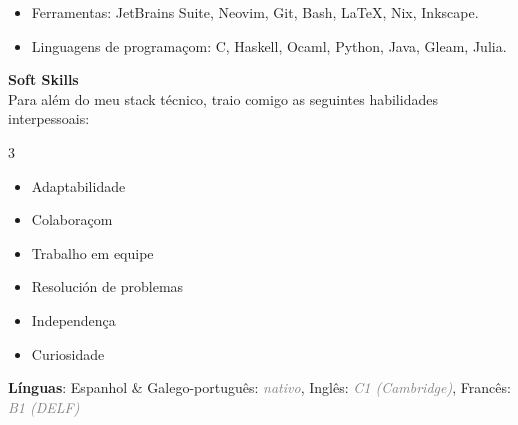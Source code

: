 \documentclass [a4paper] {extarticle} %
\newcommand{\rightcolumwidth}{0.84}
\begin{document}
\begin {flushright}
\begin {minipage} [t] {\rightcolumwidth\textwidth}

  \vspace {-8pt}
  \begin {itemize} [noitemsep]
    \item Ferramentas: JetBrains Suite, Neovim, Git, Bash, LaTeX, Nix, Inkscape.
    \item Linguagens de programaçom: C, Haskell, Ocaml, Python, Java, Gleam, Julia.
  \end {itemize}

  \textbf {Soft Skills} \\ [4pt]
  Para além do meu stack técnico, traio comigo as seguintes habilidades interpessoais:
  \vspace {-8pt}
  \begin{multicols}{3}
    \begin {itemize} [noitemsep]
      \item Adaptabilidade
      \item Colaboraçom
      \item Trabalho em equipe
      \item Resolución de problemas
      \item Independença
      \item Curiosidade
    \end {itemize}
  \end{multicols}

  \textbf{Línguas}: Espanhol \& Galego-português: \textcolor{gray}{\textit{nativo}}, Inglês: \textcolor{gray}{\textit{C1 (Cambridge)}}, Francês: \textcolor{gray}{\textit{B1 (DELF)}}

\end {minipage}
\end {flushright}
\end{document}

